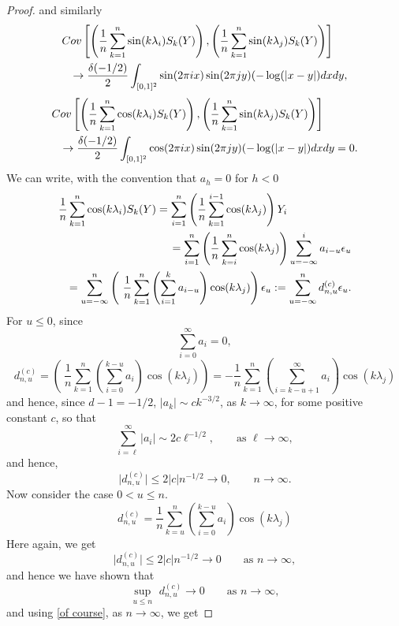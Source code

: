 \documentclass[10pt,a4paper]{amsart}
\numberwithin{equation}{section}
\begin{document}
\begin{proof}
and similarly
\begin{eqnarray*}\lefteqn{
    \textrm{Cov}\left[\left(\frac{1}{n}\sum_{k=1}^n\sin(k\lambda_{i})S_k(Y)\right),\left(\frac{1}{n}\sum_{k=1}^n\sin(k\lambda_{j})S_k(Y)\right)\right]}\\
&&\to\frac{\delta(-1/2)}{2}\int_{[0,1]^2}\sin(2\pi ix)\sin(2\pi jy)(-\log(\vert x- y\vert)dxdy,
\end{eqnarray*}
\begin{eqnarray*}\lefteqn{
    \textrm{Cov}\left[\left(\frac{1}{n}\sum_{k=1}^n\cos(k\lambda_{i})S_k(Y)\right),\left(\frac{1}{n}\sum_{k=1}^n\sin(k\lambda_{j})S_k(Y)\right)\right]}\\
   && \to\frac{\delta(-1/2)}{2}\int_{[0,1]^2}\cos(2\pi ix)\sin(2\pi jy)(-\log(\vert x- y\vert)dxdy=0.
   \end{eqnarray*}
   We can write,   with the convention that $a_h=0$ for $h<0$
\begin{eqnarray}\lefteqn{
\frac{1}{n}\sum_{k=1}^n\cos(k\lambda_{i})S_k(Y)
=\sum_{i=1}^n\left(\frac{1}{n}\sum_{k=1}^{i-1}\cos(k\lambda_j)\right)Y_i}\label{develop}\\
&&=
\sum_{i=1}^n\left(\frac{1}{n}\sum_{k=i}^n\cos(k\lambda_j)\right)
\sum_{u=-\infty}^ia_{i-u}\epsilon_u\nonumber\\
&&=\sum_{u=-\infty}^n\left(\
\frac{1}{n}\sum_{k=1}^n\left(\sum_{i=1}^ka_{i-u}\right)\cos(k\lambda_j)\right)\epsilon_u
:=\sum_{u=-\infty}^nd^{(c)}_{n,u}\epsilon_u.\label{combine}
\end{eqnarray}
For $u\le0$,  since
$$
\sum_{i=0}^\infty a_i=0,
$$
$$
d^{(c)}_{n,u}=\left(\
\frac{1}{n}\sum_{k=1}^n\left(\sum_{i=0}^{k-u}a_i\right)\cos(k\lambda_j)\right)=
-\frac{1}{n}\sum_{k=1}^n\left(\sum_{i=k-u+1}^\infty a_i\right)\cos(k\lambda_j)
$$
and hence, since $d-1=-1/2$,  $\vert a_k\vert\sim c k^{-3/2}$, as $k\to\infty$, for some positive constant $c$,
so that
$$
\sum_{i=\ell}^\infty \vert a_i\vert \sim2c\ell^{-1/2},\qquad\textrm{as }\ell\to\infty,
$$
and hence,
$$
\vert d^{(c)}_{n,u}\vert\le 2\vert c\vert n^{-1/2}\to0,\qquad n\to\infty.
$$
Now consider the case $0<u\le n$.
$$
d^{(c)}_{n,u}=\frac{1}{n}\sum_{k=u}^n\left(\sum_{i=0}^{k-u}a_i\right)\cos(k\lambda_j)
$$
Here again, we get
$$
\vert d^{(c)}_{n,u}\vert\le 2\vert c\vert n^{-1/2}\to0\qquad\textrm{as }n\to\infty,
$$
and hence we have shown that 
\begin{equation}\label{uniform u}
   \underset{u\le n}{\sup}\,\,d^{(c)}_{n,u}\to0 \qquad\textrm{as }n\to\infty,
\end{equation}
and using \eqref{of course}, as $n\to\infty$, we get

\end{proof}
\end{document}
